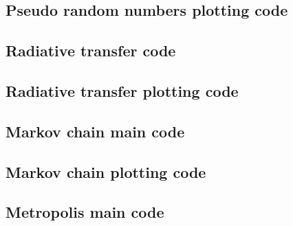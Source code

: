 \documentclass[twocolumn]{myarticle}
\begin{document}

\vspace{10pt}

\subsection{Pseudo random numbers plotting code}
\label{subsec:pseudo_random_numbers_plotting_code}


\vspace{10pt}

\subsection{Radiative transfer code}
\label{subsec:radiative_transfer_code}


\vspace{10pt}

\subsection{Radiative transfer plotting code}
\label{subsec:radiative_transfer_plotting_code}


\vspace{10pt}

\subsection{Markov chain main code}
\label{subsec:markov_chain_main_code}


\vspace{10pt}

\subsection{Markov chain plotting code}
\label{subsec:markov_chain_plotting_code}


\vspace{10pt}

\subsection{Metropolis main code}
\label{subsec:metropolis_main_code}


\vspace{10pt}
\end{document}
